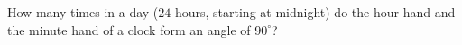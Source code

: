 How many times in a day ($24$ hours, starting at midnight) do the hour hand and the minute hand of a clock form an angle of $90^\circ$?
